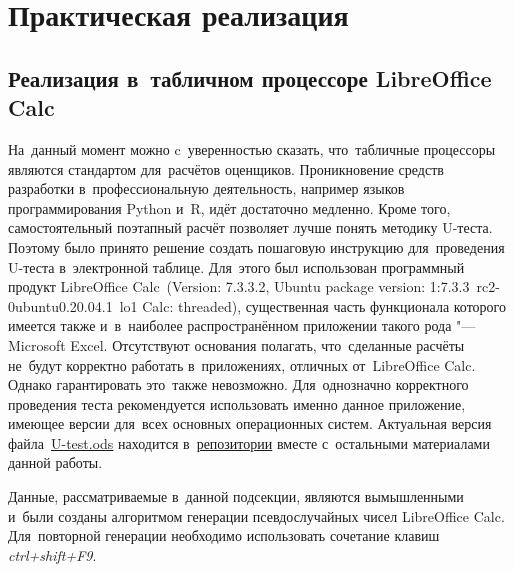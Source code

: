 \documentclass[]{scrreprt}
\begin{document}
\chapter{Практическая реализация}\label{U-test-practice}
\section{Реализация в~табличном процессоре LibreOffice Calc}\label{U-test-spreadsheet}
На~данный момент можно c~уверенностью сказать, что~табличные процессоры являются стандартом для~расчётов оценщиков. Проникновение средств разработки в~профессиональную деятельность, например языков программирования Python и~R,  идёт достаточно медленно. Кроме того, самостоятельный поэтапный расчёт позволяет лучше понять методику U-теста. Поэтому было принято решение создать пошаговую инструкцию для~проведения U-теста в~электронной таблице. Для~этого был использован программный продукт LibreOffice Calc~(Version: 7.3.3.2, Ubuntu package version: 1:7.3.3~rc2-0ubuntu0.20.04.1~lo1 Calc: threaded), существенная часть функционала которого имеется также и~в~наиболее распространённом приложении такого рода "--- \foreignlanguage{english}{Microsoft Excel}. Отсутствуют основания полагать, что~сделанные расчёты не~будут корректно работать в~приложениях, отличных от~LibreOffice Calc. Однако гарантировать это~также невозможно. Для~однозначно корректного проведения теста рекомендуется использовать именно данное приложение, имеющее версии для~всех основных операционных систем. Актуальная версия файла~\href{https://github.com/Kirill-Murashev/AI_for_valuers_book/blob/main/Parts-Chapters/Mann-Whitney-Wilcoxon/U-test.ods}{U-test.ods} находится в~\href{https://github.com/Kirill-Murashev/AI_for_valuers_book/tree/main/Parts&Chapters/Mann-Whitney-Wilcoxon}{репозитории} вместе с~остальными материалами данной работы.

Данные, рассматриваемые в~данной подсекции, являются вымышленными и~были созданы алгоритмом генерации псевдослучайных чисел LibreOffice Calc. Для~повторной генерации необходимо использовать сочетание клавиш \emph{ctrl+shift+F9}. 
\end{document}
